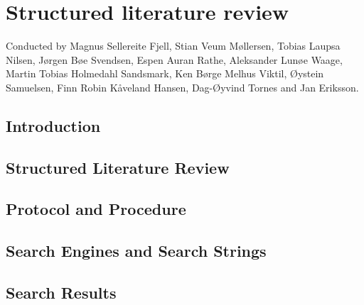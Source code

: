 
\chapter{Structured literature review}
Conducted by Magnus Sellereite Fjell, Stian Veum M{\o}llersen, Tobias Laupsa
Nilsen, J{\o}rgen B{\o}e Svendsen, Espen Auran Rathe, Aleksander Lun{\o}e Waage,
Martin Tobias Holmedahl Sandsmark, Ken B{\o}rge Melhus Viktil, {\O}ystein
Samuelsen, Finn Robin K{\aa}veland Hansen, Dag-{\O}yvind Tornes and Jan
Eriksson.

\label{appendix:slrreport}
\section{Introduction}


\section{Structured Literature Review}


\section{Protocol and Procedure}


\section{Search Engines and Search Strings}


\section{Search Results}


\clearpage
